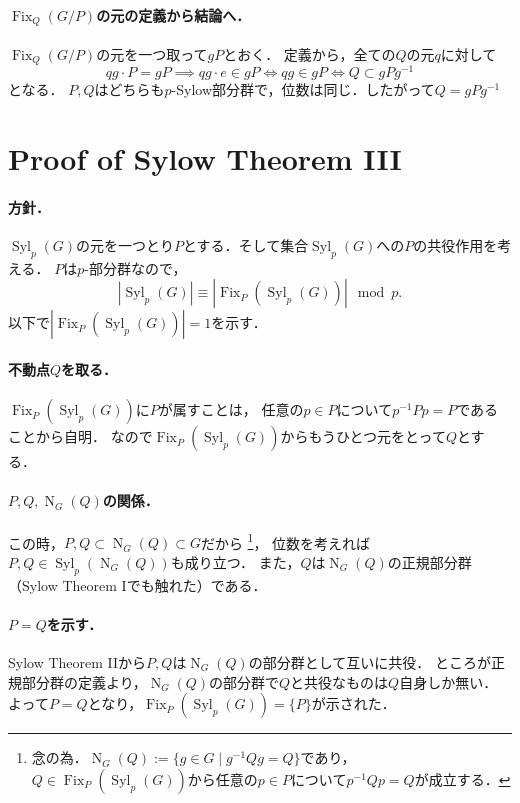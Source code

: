 \documentclass[a4paper]{jsarticle}
\newcommand{\Fix}{\operatorname{Fix}}
\newcommand{\Norm}{\operatorname{N}}
\newcommand{\Syl}{\operatorname{Syl}}
\begin{document}
    \paragraph{$\Fix_Q(G/P)$の元の定義から結論へ．}
    $\Fix_Q(G/P)$の元を一つ取って$gP$とおく．
    定義から，全ての$Q$の元$q$に対して
    \[ qg \cdot P=gP \implies qg \cdot e \in gP \iff qg \in gP \iff Q \subset gPg^{-1} \]となる．
    $P,Q$はどちらも$p$-Sylow部分群で，位数は同じ．したがって$Q=gPg^{-1}$

    \section{Proof of Sylow Theorem III}
    \paragraph{方針．}
    $\Syl_p(G)$の元を一つとり$P$とする．そして集合$\Syl_p(G)$への$P$の共役作用を考える．
    $P$は$p$-部分群なので，
    \[ |\Syl_p(G)| \equiv |\Fix_P(\Syl_p(G))| \mod p. \]
    以下で$|\Fix_P(\Syl_p(G))|=1$を示す．

    \paragraph{不動点$Q$を取る．}
    $\Fix_P(\Syl_p(G))$に$P$が属すことは，
    任意の$p \in P$について$p^{-1}Pp=P$であることから自明．
    なので$\Fix_P(\Syl_p(G))$からもうひとつ元をとって$Q$とする．

    \paragraph{$P, Q, \Norm_G(Q)$の関係．}
    この時，$P,Q \subset \Norm_G(Q) \subset G$だから
    \footnote
    {
        念の為．$\Norm_G(Q):=\{ g \in G \mid g^{-1}Qg=Q \}$であり，
        $Q \in \Fix_P(\Syl_p(G))$から任意の$p \in P$について$p^{-1}Qp=Q$が成立する．
    }，
    位数を考えれば$P,Q \in \Syl_p(\Norm_G(Q))$も成り立つ．
    また，$Q$は$\Norm_G(Q)$の正規部分群（Sylow Theorem Iでも触れた）である．

    \paragraph{$P=Q$を示す．}
    Sylow Theorem IIから$P,Q$は$\Norm_G(Q)$の部分群として互いに共役．
    ところが正規部分群の定義より，$\Norm_G(Q)$の部分群で$Q$と共役なものは$Q$自身しか無い．
    よって$P=Q$となり，$\Fix_P(\Syl_p(G))=\{ P \}$が示された．
\end{document}
